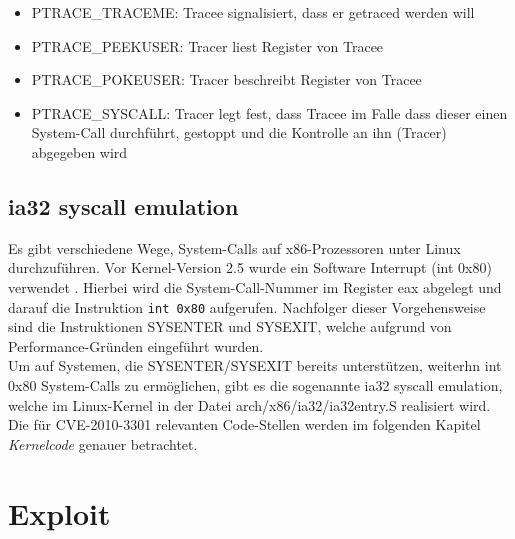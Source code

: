 \documentclass[11pt,a4paper]{article}
\begin{document}
\begin{itemize}
\item PTRACE\_TRACEME: Tracee signalisiert, dass er getraced werden will
\item PTRACE\_PEEKUSER: Tracer liest Register von Tracee
\item PTRACE\_POKEUSER: Tracer beschreibt Register von Tracee
\item PTRACE\_SYSCALL: Tracer legt fest, dass Tracee im Falle dass dieser einen System-Call durchführt, gestoppt und die Kontrolle an ihn (Tracer) abgegeben wird
\end{itemize}{\cite{DIE0}
\subsection{ia32 syscall emulation}
Es gibt verschiedene Wege, System-Calls auf x86-Prozessoren unter Linux durchzuführen. Vor Kernel-Version 2.5 wurde ein Software Interrupt (int 0x80) verwendet \cite{GAR0}. Hierbei wird die System-Call-Nummer im Register eax abgelegt und darauf die Instruktion \texttt{int 0x80} aufgerufen. Nachfolger dieser Vorgehensweise sind die Instruktionen SYSENTER und SYSEXIT, welche aufgrund von Performance-Gründen eingeführt wurden. \cite{JES0}\cite{WIK0}\\
Um auf Systemen, die SYSENTER/SYSEXIT bereits unterstützen, weiterhn int 0x80 System-Calls zu ermöglichen, gibt es die sogenannte ia32 syscall emulation, welche im Linux-Kernel in der Datei arch/x86/ia32/ia32entry.S realisiert wird. Die für CVE-2010-3301 relevanten Code-Stellen werden im folgenden Kapitel \emph{Kernelcode} genauer betrachtet.
\section{Exploit}
}
\end{document}
